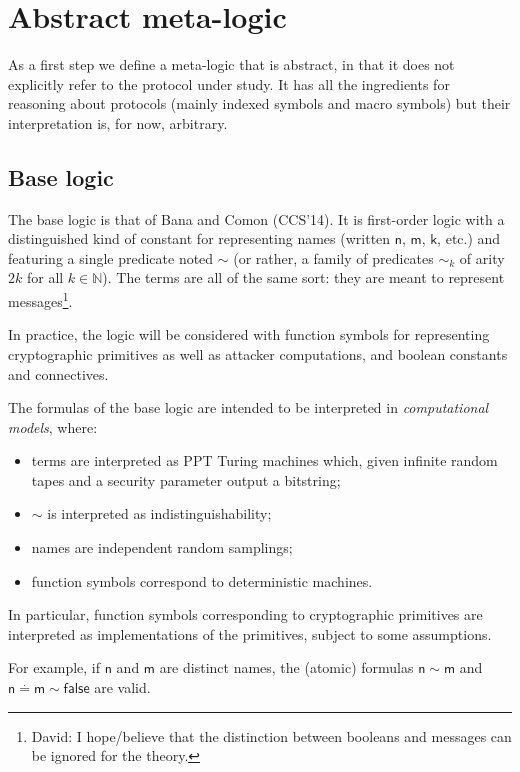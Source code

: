 \section{Abstract meta-logic}

As a first step we define a meta-logic that is abstract, in that it does
not explicitly refer to the protocol under study. It has all the ingredients
for reasoning about protocols (mainly indexed symbols and macro symbols)
but their interpretation is, for now, arbitrary.

\subsection{Base logic}

The base logic is that of Bana and Comon (CCS'14). It is first-order logic
with a distinguished kind of constant for representing names (written
$\mathsf{n}$, $\mathsf{m}$, $\mathsf{k}$, etc.)
and featuring a single predicate noted $\sim$ (or rather, a family
of predicates $\sim_k$ of arity $2 k$ for all $k\in\mathbb{N}$).
The terms are all of the same sort: they are meant to represent
messages\footnote{
  David: I hope/believe that the distinction between booleans and messages
  can be ignored for the theory.
}.

In practice, the logic will be considered with function symbols for
representing cryptographic primitives as well as attacker computations, and
boolean constants and connectives.

The formulas of the base logic are intended to be interpreted in
\emph{computational models}, where:
\begin{itemize}
  \item terms are interpreted as PPT Turing machines which,
    given infinite random tapes and a security parameter output a bitstring;
  \item $\sim$ is interpreted as indistinguishability;
  \item names are independent random samplings;
  \item function symbols correspond to deterministic machines.
\end{itemize}

In particular, function symbols corresponding to cryptographic primitives
are interpreted as implementations of the primitives, subject to some
assumptions.

For example, if $\mathsf{n}$ and $\mathsf{m}$ are distinct names,
the (atomic) formulas $\mathsf{n}\sim\mathsf{m}$ and
$\mathsf{n}\stackrel{.}{=}\mathsf{m}\sim\mathsf{false}$
are valid.

